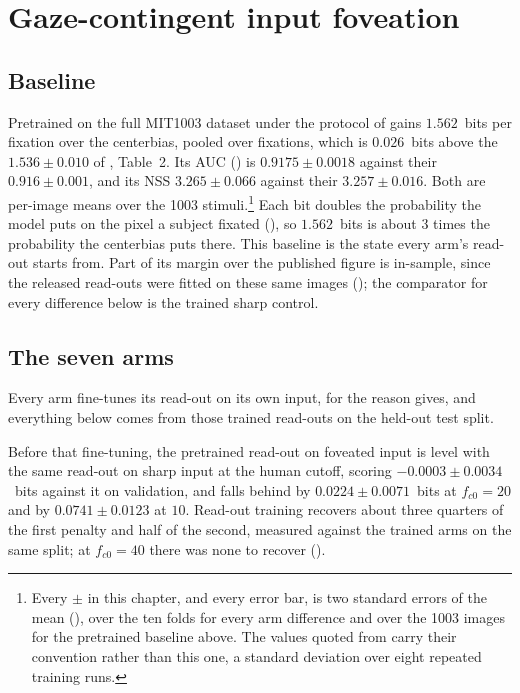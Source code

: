 \section{Gaze-contingent input foveation}
\label{sec:results-foveation}

\subsection{Baseline}
\label{subsec:results-baseline}

Pretrained \dg{} on the full MIT1003 dataset under the protocol of 
gains $1.562$~bits per fixation over the centerbias, pooled over fixations, which is
$0.026$~bits above the $1.536 \pm 0.010$ of \citet{kummerer2022deepgaze3}, Table~2. Its AUC () is
$0.9175 \pm 0.0018$ against their $0.916 \pm 0.001$, and its NSS
$3.265 \pm 0.066$ against their $3.257 \pm 0.016$. Both are per-image means over the 1003
stimuli.\footnote{Every $\pm$ in this chapter, and every error bar, is two standard errors of the mean
(), over the ten folds for every arm difference and over the 1003 images for the
pretrained baseline above. The values quoted from
\citet{kummerer2022deepgaze3} carry their convention rather than this one, a standard
deviation over eight repeated training runs.}
Each bit doubles the probability the model puts on the pixel a subject fixated (), so
$1.562$~bits is about $3$ times the probability the centerbias puts there.
This baseline is the state every arm's read-out starts from. Part of its margin over the published
figure is in-sample, since the released read-outs were fitted on these same images ();
the comparator for every difference below is the trained sharp control.

\subsection{The seven arms}
\label{subsec:results-arms}

Every arm fine-tunes its read-out on its own input, for the reason  gives, and
everything below comes from those trained read-outs on the held-out test split.

Before that fine-tuning, the pretrained read-out on foveated input is level with the same read-out on
sharp input at the human cutoff, scoring $-0.0003 \pm 0.0034$~bits against it on validation, and falls
behind by $0.0224 \pm 0.0071$~bits at $f_{c0} = 20$ and by $0.0741 \pm 0.0123$ at $10$.
Read-out training recovers about three quarters of the first penalty and half of the second, measured
against the trained arms on the same split; at $f_{c0} = 40$ there was none to recover
().

